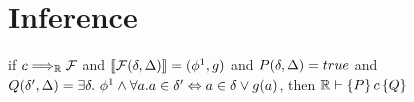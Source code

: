 \section{Inference}
\label{sec:inference}





\begin{theorem}
if $c \Longrightarrow_{\mathbb{R}} \mathcal{F}$ and $\llbracket \mathcal{F}(\delta,\Delta) \rrbracket = (\phi^1,g)$ and
$P(\delta,\Delta) = true$ and $Q(\delta',\Delta) = \exists\delta.~ \phi^1 \wedge
  \forall a. a\in\delta' \Leftrightarrow a\in\delta \vee g(a)$, then
  $\mathbb{R} \vdash \{P\}\,c\,\{Q\}$
\end{theorem}
